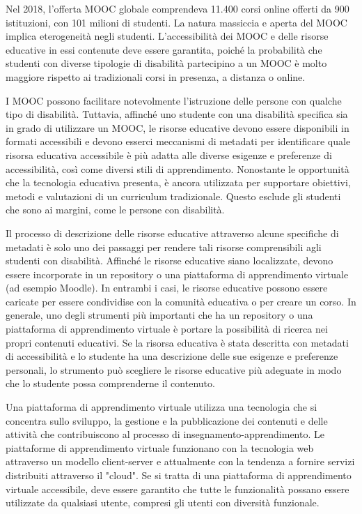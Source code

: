 Nel 2018, l'offerta MOOC globale comprendeva 11.400 corsi online offerti da 900 istituzioni, con 101 milioni di studenti. La natura massiccia e aperta del MOOC implica eterogeneità negli studenti. L'accessibilità dei MOOC e delle risorse educative in essi contenute deve essere garantita, poiché la probabilità che studenti con diverse tipologie di disabilità partecipino a un MOOC è molto maggiore rispetto ai tradizionali corsi in presenza, a distanza o online. 

I MOOC possono facilitare notevolmente l'istruzione delle persone con qualche tipo di disabilità. Tuttavia, affinché uno studente con una disabilità specifica sia in grado di utilizzare un MOOC, le risorse educative devono essere disponibili in formati accessibili e devono esserci meccanismi di metadati per identificare quale risorsa educativa accessibile è più adatta alle diverse esigenze e preferenze di accessibilità, così come diversi stili di apprendimento. Nonostante le opportunità che la tecnologia educativa presenta, è ancora utilizzata per supportare obiettivi, metodi e valutazioni di un curriculum tradizionale. Questo esclude gli studenti che sono ai margini, come le persone con disabilità.

Il processo di descrizione delle risorse educative attraverso alcune specifiche di metadati è solo uno dei passaggi per rendere tali risorse comprensibili agli studenti con disabilità. Affinché le risorse educative siano localizzate, devono essere incorporate in un repository o una piattaforma di apprendimento virtuale (ad esempio Moodle). In entrambi i casi, le risorse educative possono essere caricate per essere condividise con la comunità educativa o per creare un corso. In generale, uno degli strumenti più importanti che ha un repository o una piattaforma di apprendimento virtuale è portare la possibilità di ricerca nei propri contenuti educativi. Se la risorsa educativa è stata descritta con metadati di accessibilità e lo studente ha una descrizione delle sue esigenze e preferenze personali, lo strumento può scegliere le risorse educative più adeguate in modo che lo studente possa comprenderne il contenuto.

Una piattaforma di apprendimento virtuale utilizza una tecnologia che si concentra sullo sviluppo, la gestione e la pubblicazione dei contenuti e delle attività che contribuiscono al processo di insegnamento-apprendimento. Le piattaforme di apprendimento virtuale funzionano con la tecnologia web attraverso un modello client-server e attualmente con la tendenza a fornire servizi distribuiti attraverso il "cloud". Se si tratta di una piattaforma di apprendimento virtuale accessibile, deve essere garantito che tutte le funzionalità possano essere utilizzate da qualsiasi utente, compresi gli utenti con diversità funzionale\cite{edures}.

